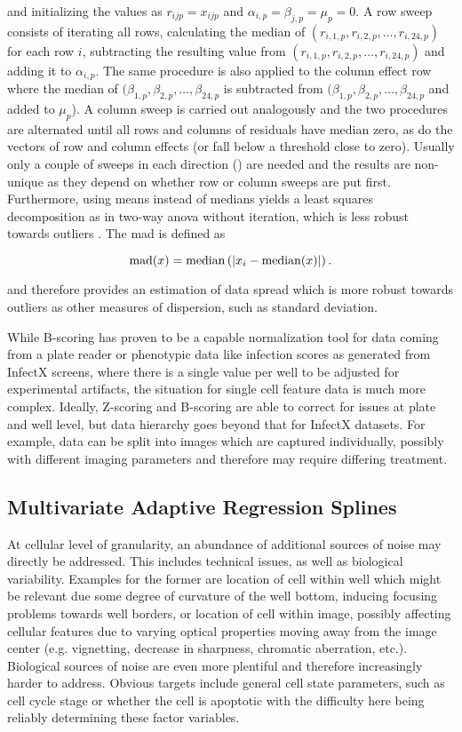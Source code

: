 and initializing the values as $r_{ijp} = x_{ijp}$ and $\alpha_{i,p} = \beta_{j,p} = \mu_p = 0$. A row sweep consists of iterating all rows, calculating the median of $(r_{i,1,p}, r_{i,2,p}, \dotsc, r_{i,24,p})$ for each row $i$, subtracting the resulting value from $(r_{i,1,p}, r_{i,2,p}, \dotsc, r_{i,24,p})$ and adding it to $\alpha_{i,p}$. The same procedure is also applied to the column effect row where the median of $(\beta_{1,p}, \beta_{2,p}, \dotsc, \beta_{24,p}$ is subtracted from $(\beta_{1,p}, \beta_{2,p}, \dotsc, \beta_{24,p}$ and added to $\mu_p$). A column sweep is carried out analogously and the two procedures are alternated until all rows and columns of residuals have median zero, as do the vectors of row and column effects (or fall below a threshold close to zero). Usually only a couple of sweeps in each direction () are needed and the results are non-unique as they depend on whether row or column sweeps are put first. Furthermore, using means instead of medians yields a least squares decomposition as in two-way \gls{anova} without iteration, which is less robust towards outliers \citep{Brown2004,Venables2002}. The \gls{mad} is defined as

\begin{equation}
  \operatorname{mad}(x) = \operatorname{median}\left(\lvert x_i-\operatorname{median}(x)\rvert\right).
\end{equation}

and therefore provides an estimation of data spread which is more robust towards outliers as other measures of dispersion, such as standard deviation.

While B-scoring has proven to be a capable normalization tool for data coming from a plate reader or phenotypic data like infection scores as generated from InfectX screens, where there is a single value per well to be adjusted for experimental artifacts, the situation for single cell feature data is much more complex. Ideally, Z-scoring and B-scoring are able to correct for issues at plate and well level, but data hierarchy goes beyond that for InfectX datasets. For example, data can be split into images which are captured individually, possibly with different imaging parameters and therefore may require differing treatment.

\subsection{Multivariate Adaptive Regression Splines}
At cellular level of granularity, an abundance of additional sources of noise may directly be addressed. This includes technical issues, as well as biological variability. Examples for the former are location of cell within well which might be relevant due some degree of curvature of the well bottom, inducing focusing problems towards well borders, or location of cell within image, possibly affecting cellular features due to varying optical properties moving away from the image center (e.g. vignetting, decrease in sharpness, chromatic aberration, etc.). Biological sources of noise are even more plentiful and therefore increasingly harder to address. Obvious targets include general cell state parameters, such as cell cycle stage or whether the cell is apoptotic with the difficulty here being reliably determining these factor variables.

